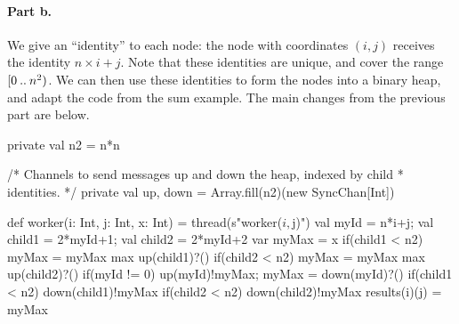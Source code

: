 \begin{answerI}

\paragraph*{Part b.} 

We give an ``identity'' to each node: the node with coordinates $(i,j)$
receives the identity $n \times i + j$.  Note that these identities are
unique, and cover the range $[0 \mathbin{..} n^2)$.  We can then use these
identities to form the nodes into a binary heap, and adapt the code from the
sum example.  The main changes from the previous part are below.
%   
\begin{scala}
  private val n2 = n*n

  /* Channels to send messages up and down the heap, indexed by child
   * identities. */
  private val up, down = Array.fill(n2)(new SyncChan[Int]) 

  def worker(i: Int, j: Int, x: Int) = thread(s"worker($i, $j)"){
    val myId = n*i+j; val child1 = 2*myId+1; val child2 = 2*myId+2
    var myMax = x
    if(child1 < n2) myMax = myMax max up(child1)?()
    if(child2 < n2) myMax = myMax max up(child2)?()
    if(myId != 0){ up(myId)!myMax; myMax = down(myId)?() }
    if(child1 < n2) down(child1)!myMax
    if(child2 < n2) down(child2)!myMax
    results(i)(j) = myMax
  }
\end{scala}
\end{answerI}
